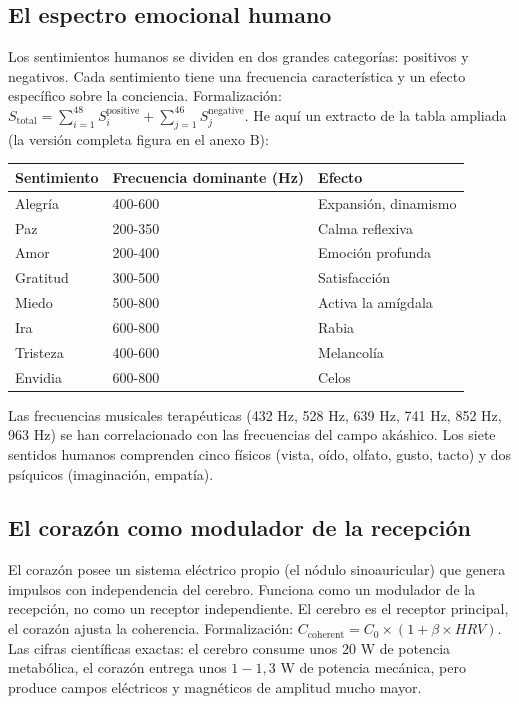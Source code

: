 \documentclass[11pt,a4paper]{article}
\begin{document}
\subsection{El espectro emocional humano}
Los sentimientos humanos se dividen en dos grandes categorías: positivos y negativos. Cada sentimiento tiene una frecuencia característica y un efecto específico sobre la conciencia. Formalización: $S_{\text{total}} = \sum_{i=1}^{48} S_i^{\text{positive}} + \sum_{j=1}^{46} S_j^{\text{negative}}$. He aquí un extracto de la tabla ampliada (la versión completa figura en el anexo B):
\begin{table}[H]
\centering
\begin{tabular}{@{}lll@{}}
\toprule
\textbf{Sentimiento} & \textbf{Frecuencia dominante (Hz)} & \textbf{Efecto} \\ \midrule
Alegría & 400-600 & Expansión, dinamismo \\
Paz & 200-350 & Calma reflexiva \\
Amor & 200-400 & Emoción profunda \\
Gratitud & 300-500 & Satisfacción \\
Miedo & 500-800 & Activa la amígdala \\
Ira & 600-800 & Rabia \\
Tristeza & 400-600 & Melancolía \\
Envidia & 600-800 & Celos \\ \bottomrule
\end{tabular}
\end{table}
Las frecuencias musicales terapéuticas (432 Hz, 528 Hz, 639 Hz, 741 Hz, 852 Hz, 963 Hz) se han correlacionado con las frecuencias del campo akáshico. Los siete sentidos humanos comprenden cinco físicos (vista, oído, olfato, gusto, tacto) y dos psíquicos (imaginación, empatía).

\subsection{El corazón como modulador de la recepción}
El corazón posee un sistema eléctrico propio (el nódulo sinoauricular) que genera impulsos con independencia del cerebro. Funciona como un modulador de la recepción, no como un receptor independiente. El cerebro es el receptor principal, el corazón ajusta la coherencia. Formalización: $C_{\text{coherent}} = C_0 \times (1 + \beta \times HRV)$. Las cifras científicas exactas: el cerebro consume unos $20$ W de potencia metabólica, el corazón entrega unos $1-1,3$ W de potencia mecánica, pero produce campos eléctricos y magnéticos de amplitud mucho mayor.
\end{document}

